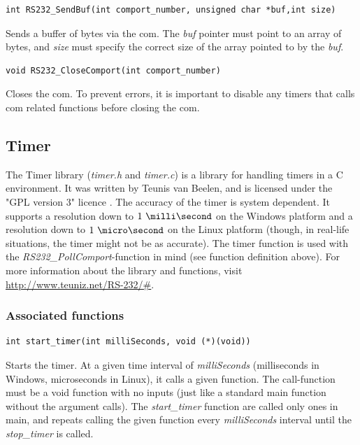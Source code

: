\documentclass[main.tex]{subfiles}
\begin{document}
\begin{lstlisting}[frame=single] 
int RS232_SendBuf(int comport_number, unsigned char *buf,int size)
\end{lstlisting}
Sends a buffer of bytes via the \gls{com}. The \textit{buf} pointer must point to an array of bytes, and \textit{size} must specify the correct size of the array pointed to by the \textit{buf}.\\

\begin{lstlisting}[frame=single] 
void RS232_CloseComport(int comport_number)
\end{lstlisting}
Closes the \gls{com}. To prevent errors, it is important to disable any timers that calls \gls{com} related functions before closing the \gls{com}.\\

\subsection{Timer}

The Timer library (\textit{timer.h} and \textit{timer.c}) is a library for handling timers in a C environment. It was written by Teunis van Beelen, and is licensed under the "GPL version 3" licence \cite{gpl3}. The accuracy of the timer is system dependent. It supports a resolution down to $1~\milli\second$ on the Windows platform and a resolution down to $1~\micro\second$ on the Linux platform (though, in real-life situations, the timer might not be as accurate). The timer function is used with the \textit{RS232\_PollComport}-function in mind (see function definition above). For more information about the library and functions, visit \url{http://www.teuniz.net/RS-232/#}.

\subsubsection{Associated functions}


\begin{lstlisting}[frame=single] 
int start_timer(int milliSeconds, void (*)(void))
\end{lstlisting}

Starts the timer. At a given time interval of \textit{milliSeconds} (milliseconds in Windows, microseconds in Linux), it calls a given function. The call-function must be a void function with no inputs (just like a standard main function without the argument calls). The \textit{start\_timer} function are called only ones in main, and repeats calling the given function every \textit{milliSeconds} interval until the \textit{stop\_timer} is called.\\
\end{document}
